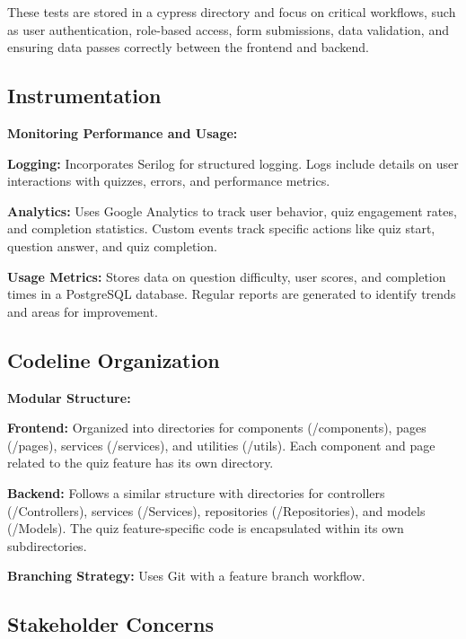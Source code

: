 \documentclass{article}
\begin{document}
These tests are stored in a cypress directory and focus on critical workflows, such as user authentication, role-based access, form submissions, data validation, and ensuring data passes correctly between the frontend and backend.

\subsection{Instrumentation}

\item \textbf{Monitoring Performance and Usage:}

\item \textbf{Logging:} Incorporates Serilog for structured logging. Logs include details on user interactions with quizzes, errors, and performance metrics.

\item \textbf{Analytics:} Uses Google Analytics to track user behavior, quiz engagement rates, and completion statistics. Custom events track specific actions like quiz start, question answer, and quiz completion.

\item \textbf{Usage Metrics:} Stores data on question difficulty, user scores, and completion times in a PostgreSQL database. Regular reports are generated to identify trends and areas for improvement.

\subsection{Codeline Organization}

\textbf{Modular Structure:}

\item \textbf{Frontend:} Organized into directories for components (/components), pages (/pages), services (/services), and utilities (/utils). Each component and page related to the quiz feature has its own directory.

\item \textbf{Backend:} Follows a similar structure with directories for controllers (/Controllers), services (/Services), repositories (/Repositories), and models (/Models). The quiz feature-specific code is encapsulated within its own subdirectories.

\item \textbf{Branching Strategy:} Uses Git with a feature branch workflow.

\subsection{Stakeholder Concerns}
\end{document}
